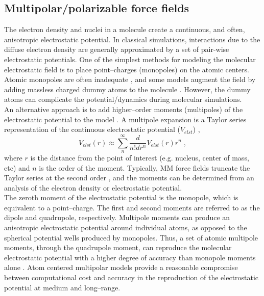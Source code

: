 \documentclass[12pt]{report}
\begin{document}
\subsection{Multipolar/polarizable force fields}

The electron density and nuclei in a molecule create a continuous, and often, 
anisotropic electrostatic potential.
In classical simulations, interactions due to the diffuse electron density are
generally approximated by a set of pair-wise electrostatic potentials.
One of the simplest methods for modeling the molecular electrostatic field is
to place point--charges (monopoles) on the atomic centers.
Atomic monopoles are often inadequate \cite{Cisneros2014,Kramer2014}, and
some models augment the field by adding massless charged dummy atoms to the
molecule \cite{Jorgensen1983,Mahoney2000}. 
However, the dummy atoms can complicate the potential/dynamics during
molecular simulations. \\

An alternative approach is to add higher--order moments (multipoles) of the 
electrostatic potential to the model
\cite{Cisneros2014,Laury2015,Shi2013,Stone2013}.
A multipole expansion is a Taylor series representation of the continuous
electrostatic potential ($V_{elst}$) \cite{Stone2013},
\begin{equation}
 V_{elst}(r) \approx \sum_n^\infty \frac{d}{n!dr^n} V_{elst}(r)r^n \; ,
\end{equation}
where $r$ is the distance from the point of interest (e.g. nucleus, center of 
mass, etc) and $n$ is the order of the moment.
Typically, MM force fields truncate the Taylor series at the second order 
\cite{Cisneros2014,Laury2015,Shi2013}, and the moments can be determined 
from an analysis of the electron density or electrostatic potential. \\

The zeroth moment of the electrostatic potential is the monopole, which is 
equivalent to a point--charge.
The first and second moments are referred to as the dipole and quadrupole,
respectively. Multipole moments can produce an anisotropic electrostatic
potential around individual atoms, as opposed to the spherical potential
wells produced by monopoles.
Thus, a set of atomic multipole moments, through the quadrupole moment, can
reproduce the molecular electrostatic potential with a higher degree of
accuracy than monopole moments alone \cite{Cisneros2014,Stone2013}.
Atom centered multipolar models provide a reasonable compromise between
computational cost and accuracy in the reproduction of the electrostatic
potential at medium and long--range.
\end{document}

